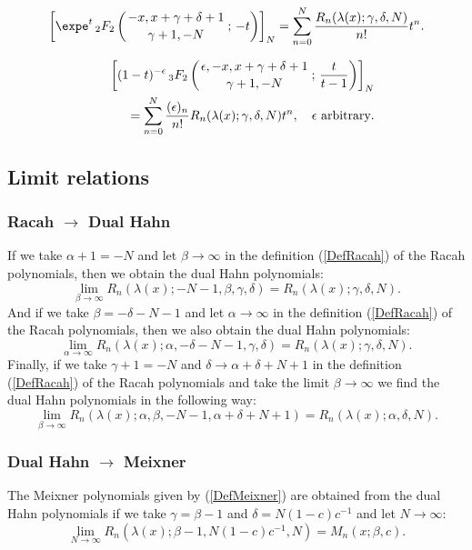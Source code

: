 \documentclass[envcountchap,graybox]{svmono}
\newcounter{rom}
\newcommand{\hyp}[5]{\mbox{}_{#1}{F}_{#2}
\left(\genfrac{}{}{0pt}{}{#3}{#4}\,;\,#5\right)}
\begin{document}
\begin{equation}
\label{GenDualHahn3}
\left[\expe^t\,\hyp{2}{2}{-x,x+\gamma+\delta+1}{\gamma+1,-N}{-t}\right]_N=\sum_{n=0}^N
\frac{R_n(\lambda(x);\gamma,\delta,N)}{n!}t^n.
\end{equation}

\begin{eqnarray}
\label{GenDualHahn4}
& &\left[(1-t)^{-\epsilon}\,\hyp{3}{2}{\epsilon,-x,x+\gamma+\delta+1}{\gamma+1,-N}{\frac{t}{t-1}}\right]_N\nonumber\\
& &{}=\sum_{n=0}^N\frac{(\epsilon)_n}{n!}R_n(\lambda(x);\gamma,\delta,N)t^n,
\quad\textrm{$\epsilon$ arbitrary}.
\end{eqnarray}

\subsection*{Limit relations}

\subsubsection*{Racah $\rightarrow$ Dual Hahn}
If we take $\alpha+1=-N$ and let $\beta\rightarrow\infty$ in the definition (\ref{DefRacah})
of the Racah polynomials, then we obtain the dual Hahn polynomials:
$$\lim_{\beta\rightarrow\infty}
R_n(\lambda(x);-N-1,\beta,\gamma,\delta)=R_n(\lambda(x);\gamma,\delta,N).$$
And if we take $\beta=-\delta-N-1$ and let $\alpha\rightarrow\infty$ in the definition (\ref{DefRacah})
of the Racah polynomials, then we also obtain the dual Hahn polynomials:
$$\lim_{\alpha\rightarrow\infty}
R_n(\lambda(x);\alpha,-\delta-N-1,\gamma,\delta)=R_n(\lambda(x);\gamma,\delta,N).$$
Finally, if we take $\gamma+1=-N$ and $\delta\rightarrow\alpha+\delta+N+1$ in the definition
(\ref{DefRacah}) of the Racah polynomials and take the limit
$\beta\rightarrow\infty$ we find the dual Hahn polynomials in the following way:
$$\lim_{\beta\rightarrow\infty}
R_n(\lambda(x);\alpha,\beta,-N-1,\alpha+\delta+N+1)=R_n(\lambda(x);\alpha,\delta,N).$$

\subsubsection*{Dual Hahn $\rightarrow$ Meixner}
The Meixner polynomials given by (\ref{DefMeixner}) are obtained from the dual Hahn polynomials
if we take $\gamma=\beta-1$ and $\delta=N(1-c)c^{-1}$ and let $N\rightarrow\infty$:
\begin{equation}
\lim_{N\rightarrow\infty}
R_n(\lambda(x);\beta-1,N(1-c)c^{-1},N)=M_n(x;\beta,c).
\end{equation}
\end{document}
